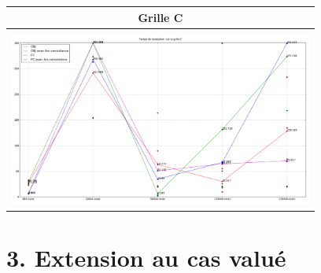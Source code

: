 \documentclass[a4paper,12pt]{report}
\begin{document}
\begin{enumerate}
\begin{table}[!h]
\begin{center}
\begin{tabular}{|c|}

\hline
Grille C \\
\hline
\\
\includegraphics[width=10cm]{Grille_C.png}\\

\hline

\end{tabular}
\end{center}
\end{table}

\end{enumerate}

\section*{3. Extension au cas valué}
\end{document}
